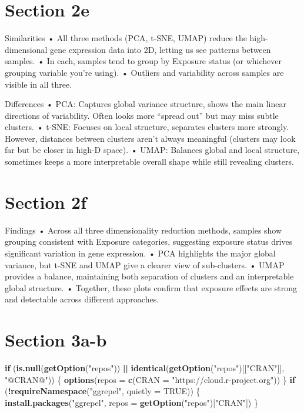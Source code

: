 \documentclass[
]{article}
\newenvironment{Shaded}{\begin{snugshade}}{\end{snugshade}}
\newcommand{\AttributeTok}[1]{\textcolor[rgb]{0.13,0.29,0.53}{#1}}
\newcommand{\ConstantTok}[1]{\textcolor[rgb]{0.56,0.35,0.01}{#1}}
\newcommand{\ControlFlowTok}[1]{\textcolor[rgb]{0.13,0.29,0.53}{\textbf{#1}}}
\newcommand{\FunctionTok}[1]{\textcolor[rgb]{0.13,0.29,0.53}{\textbf{#1}}}
\newcommand{\NormalTok}[1]{#1}
\newcommand{\SpecialCharTok}[1]{\textcolor[rgb]{0.81,0.36,0.00}{\textbf{#1}}}
\newcommand{\StringTok}[1]{\textcolor[rgb]{0.31,0.60,0.02}{#1}}
\begin{document}
\section{Section 2e}\label{section-2e}

Similarities • All three methods (PCA, t-SNE, UMAP) reduce the
high-dimensional gene expression data into 2D, letting us see patterns
between samples. • In each, samples tend to group by Exposure status (or
whichever grouping variable you're using). • Outliers and variability
across samples are visible in all three.

Differences • PCA: Captures global variance structure, shows the main
linear directions of variability. Often looks more ``spread out'' but
may miss subtle clusters. • t-SNE: Focuses on local structure, separates
clusters more strongly. However, distances between clusters aren't
always meaningful (clusters may look far but be closer in high-D space).
• UMAP: Balances global and local structure, sometimes keeps a more
interpretable overall shape while still revealing clusters.

\section{Section 2f}\label{section-2f}

Findings • Across all three dimensionality reduction methods, samples
show grouping consistent with Exposure categories, suggesting exposure
status drives significant variation in gene expression. • PCA highlights
the major global variance, but t-SNE and UMAP give a clearer view of
sub-clusters. • UMAP provides a balance, maintaining both separation of
clusters and an interpretable global structure. • Together, these plots
confirm that exposure effects are strong and detectable across different
approaches.

\section{Section 3a-b}\label{section-3a-b}

\begin{Shaded}
\begin{Highlighting}[]
\ControlFlowTok{if}\NormalTok{ (}\FunctionTok{is.null}\NormalTok{(}\FunctionTok{getOption}\NormalTok{(}\StringTok{"repos"}\NormalTok{)) }\SpecialCharTok{||} \FunctionTok{identical}\NormalTok{(}\FunctionTok{getOption}\NormalTok{(}\StringTok{"repos"}\NormalTok{)[[}\StringTok{"CRAN"}\NormalTok{]], }\StringTok{"@CRAN@"}\NormalTok{)) \{}
  \FunctionTok{options}\NormalTok{(}\AttributeTok{repos =} \FunctionTok{c}\NormalTok{(}\AttributeTok{CRAN =} \StringTok{"https://cloud.r{-}project.org"}\NormalTok{))}
\NormalTok{\}}
\ControlFlowTok{if}\NormalTok{ (}\SpecialCharTok{!}\FunctionTok{requireNamespace}\NormalTok{(}\StringTok{"ggrepel"}\NormalTok{, }\AttributeTok{quietly =} \ConstantTok{TRUE}\NormalTok{)) \{}
  \FunctionTok{install.packages}\NormalTok{(}\StringTok{"ggrepel"}\NormalTok{, }\AttributeTok{repos =} \FunctionTok{getOption}\NormalTok{(}\StringTok{"repos"}\NormalTok{)[}\StringTok{"CRAN"}\NormalTok{])}
\NormalTok{\}}
\end{Highlighting}
\end{Shaded}
\end{document}
